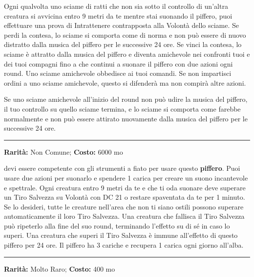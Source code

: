 \begin{multicols}{2}
Ogni qualvolta uno sciame di ratti che non sia sotto il controllo di un'altra creatura si avvicina entro 9 metri da te mentre stai suonando il piffero, puoi effettuare una prova di Intrattenere contrapposta alla Volontà dello sciame. Se perdi la contesa, lo sciame si comporta come di norma e non può essere di nuovo distratto dalla musica del piffero per le successive 24 ore. Se vinci la contesa, lo sciame è attratto dalla musica del piffero e diventa amichevole nei confronti tuoi e dei tuoi compagni fino a che continui a suonare il piffero con due azioni ogni round. Uno sciame amichevole obbedisce ai tuoi comandi. Se non impartisci ordini a uno sciame amichevole, questo si difenderà ma non compirà altre azioni.

Se uno sciame amichevole all'inizio del round non può udire la musica del piffero, il tuo controllo su quello sciame termina, e lo sciame si comporta come farebbe normalmente e non può essere attirato nuovamente dalla musica del piffero per le successive 24 ore.

\smallskip\noindent\rule{\linewidth}{2pt}  \hypertarget{PifferodelloSpavento}{}\smallskip{}\noindent\label{PifferodelloSpavento}

\textbf{Rarità:} Non Comune; \textbf{Costo:} 6000 mo

devi essere competente con gli strumenti a fiato per usare questo \textbf{piffero}. Puoi usare due azioni per suonarlo e spendere 1 carica per creare un suono incantevole e spettrale. Ogni creatura entro 9 metri da te e che ti oda suonare deve superare un Tiro Salvezza su Volontà con DC 21 o restare spaventata da te per 1 minuto. Se lo desideri, tutte le creature nell'area che non ti siano ostili possono superare automaticamente il loro Tiro Salvezza. Una creatura che fallisca il Tiro Salvezza può ripeterlo alla fine del suo round, terminando l'effetto su di sé in caso lo superi. Una creatura che superi il Tiro Salvezza è immune all'effetto di questo piffero per 24 ore. Il piffero ha 3 cariche e recupera 1 carica ogni giorno all'alba.

\smallskip\noindent\rule{\linewidth}{2pt}  \hypertarget{PigmentidelleMeraviglie}{}\smallskip{}\noindent\label{PigmentidelleMeraviglie}

\textbf{Rarità:} Molto Raro; \textbf{Costo:} 400 mo


\end{multicols}

